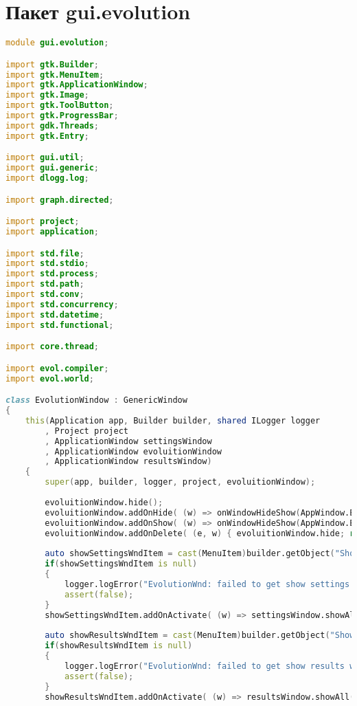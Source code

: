 \documentclass[russian,utf8,emptystyle]{eskdtext}
\begin{document}
\section{Пакет gui.evolution}
\begin{lstlisting}[language=D]
module gui.evolution;

import gtk.Builder;
import gtk.MenuItem;
import gtk.ApplicationWindow;
import gtk.Image;
import gtk.ToolButton;
import gtk.ProgressBar;
import gdk.Threads;
import gtk.Entry;

import gui.util;
import gui.generic;
import dlogg.log;

import graph.directed;

import project;
import application;

import std.file;
import std.stdio;
import std.process;
import std.path;
import std.conv;
import std.concurrency;
import std.datetime;
import std.functional;

import core.thread;

import evol.compiler;
import evol.world;

class EvolutionWindow : GenericWindow
{
    this(Application app, Builder builder, shared ILogger logger
        , Project project
        , ApplicationWindow settingsWindow
        , ApplicationWindow evoluitionWindow
        , ApplicationWindow resultsWindow)
    {
        super(app, builder, logger, project, evoluitionWindow);
        
        evoluitionWindow.hide();
        evoluitionWindow.addOnHide( (w) => onWindowHideShow(AppWindow.Evolution, true) );
        evoluitionWindow.addOnShow( (w) => onWindowHideShow(AppWindow.Evolution, false) );
        evoluitionWindow.addOnDelete( (e, w) { evoluitionWindow.hide; return true; } );
        
        auto showSettingsWndItem = cast(MenuItem)builder.getObject("ShowSettingsWndItem2");
        if(showSettingsWndItem is null)
        {
            logger.logError("EvolutionWnd: failed to get show settings wnd item!");
            assert(false);
        }
        showSettingsWndItem.addOnActivate( (w) => settingsWindow.showAll() );
        
        auto showResultsWndItem = cast(MenuItem)builder.getObject("ShowResultsWndItem2");
        if(showResultsWndItem is null)
        {
            logger.logError("EvolutionWnd: failed to get show results wnd item!");
            assert(false);
        }
        showResultsWndItem.addOnActivate( (w) => resultsWindow.showAll() ); 
        

\end{lstlisting}
\end{document}
